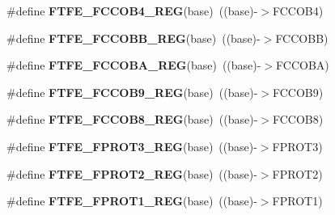 \begin{DoxyCompactItemize}
\item 
\#define {\bfseries F\+T\+F\+E\+\_\+\+F\+C\+C\+O\+B4\+\_\+\+R\+EG}(base)~((base)-\/$>$F\+C\+C\+O\+B4)\hypertarget{group__FTFE__Register__Accessor__Macros_ga211ffcfaf46f1ba8d5b32fbd4d1dca28}{}\label{group__FTFE__Register__Accessor__Macros_ga211ffcfaf46f1ba8d5b32fbd4d1dca28}

\item 
\#define {\bfseries F\+T\+F\+E\+\_\+\+F\+C\+C\+O\+B\+B\+\_\+\+R\+EG}(base)~((base)-\/$>$F\+C\+C\+O\+BB)\hypertarget{group__FTFE__Register__Accessor__Macros_ga8d9fa6e59edfcbbb72b4cf4c500495f3}{}\label{group__FTFE__Register__Accessor__Macros_ga8d9fa6e59edfcbbb72b4cf4c500495f3}

\item 
\#define {\bfseries F\+T\+F\+E\+\_\+\+F\+C\+C\+O\+B\+A\+\_\+\+R\+EG}(base)~((base)-\/$>$F\+C\+C\+O\+BA)\hypertarget{group__FTFE__Register__Accessor__Macros_ga2c1fdb064c3b83a80706bcabb81c88cf}{}\label{group__FTFE__Register__Accessor__Macros_ga2c1fdb064c3b83a80706bcabb81c88cf}

\item 
\#define {\bfseries F\+T\+F\+E\+\_\+\+F\+C\+C\+O\+B9\+\_\+\+R\+EG}(base)~((base)-\/$>$F\+C\+C\+O\+B9)\hypertarget{group__FTFE__Register__Accessor__Macros_gaf6f55c2b4d0ba68f354b31b30e3757f5}{}\label{group__FTFE__Register__Accessor__Macros_gaf6f55c2b4d0ba68f354b31b30e3757f5}

\item 
\#define {\bfseries F\+T\+F\+E\+\_\+\+F\+C\+C\+O\+B8\+\_\+\+R\+EG}(base)~((base)-\/$>$F\+C\+C\+O\+B8)\hypertarget{group__FTFE__Register__Accessor__Macros_gae0790024976a051b793b3cc22fd2d8f4}{}\label{group__FTFE__Register__Accessor__Macros_gae0790024976a051b793b3cc22fd2d8f4}

\item 
\#define {\bfseries F\+T\+F\+E\+\_\+\+F\+P\+R\+O\+T3\+\_\+\+R\+EG}(base)~((base)-\/$>$F\+P\+R\+O\+T3)\hypertarget{group__FTFE__Register__Accessor__Macros_ga42160955dbea737acb10e834ead4e911}{}\label{group__FTFE__Register__Accessor__Macros_ga42160955dbea737acb10e834ead4e911}

\item 
\#define {\bfseries F\+T\+F\+E\+\_\+\+F\+P\+R\+O\+T2\+\_\+\+R\+EG}(base)~((base)-\/$>$F\+P\+R\+O\+T2)\hypertarget{group__FTFE__Register__Accessor__Macros_ga7aec6eb359a86e456cd6de28dbab6659}{}\label{group__FTFE__Register__Accessor__Macros_ga7aec6eb359a86e456cd6de28dbab6659}

\item 
\#define {\bfseries F\+T\+F\+E\+\_\+\+F\+P\+R\+O\+T1\+\_\+\+R\+EG}(base)~((base)-\/$>$F\+P\+R\+O\+T1)\hypertarget{group__FTFE__Register__Accessor__Macros_ga9147ed52d0357f7bdb91d136b8c06838}{}\label{group__FTFE__Register__Accessor__Macros_ga9147ed52d0357f7bdb91d136b8c06838}


\end{DoxyCompactItemize}
